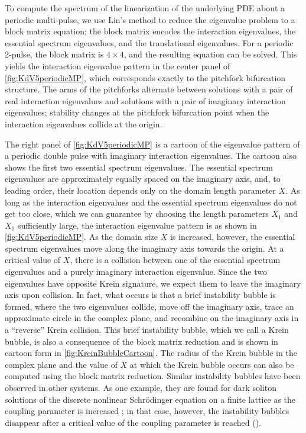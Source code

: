 \documentclass[12pt]{elsarticle}
\theoremstyle{plain}
\theoremstyle{definition}
\theoremstyle{remark}
\numberwithin{theorem}{section}
\numberwithin{equation}{section}
\begin{document}
To compute the spectrum of the linearization of the underlying PDE about a periodic multi-pulse, we use Lin's method to reduce the eigenvalue problem to a block matrix equation; the block matrix encodes the interaction eigenvalues, the essential spectrum eigenvalues, and the translational eigenvalues. For a periodic 2-pulse, the block matrix is $4\times4$, and the resulting equation can be solved. This yields the interaction eigenvalue pattern in the center panel of \cref{fig:KdV5periodicMP}, which corresponds exactly to the pitchfork bifurcation structure. The arms of the pitchforks alternate between solutions with a pair of real interaction eigenvalues and solutions with a pair of imaginary interaction eigenvalues; stability changes at the pitchfork bifurcation point when the interaction eigenvalues collide at the origin. 

The right panel of \cref{fig:KdV5periodicMP} is a cartoon of the eigenvalue pattern of a periodic double pulse with imaginary interaction eigenvalues. The cartoon also shows the first two essential spectrum eigenvalues. The essential spectrum eigenvalues are approximately equally spaced on the imaginary axis, and, to leading order, their location depends only on the domain length parameter $X$. As long as the interaction eigenvalues and the essential spectrum eigenvalues do not get too close, which we can guarantee by choosing the length parameters $X_1$ and $X_1$ sufficiently large, the interaction eigenvalue pattern is as shown in \cref{fig:KdV5periodicMP}. As the domain size $X$ is increased, however, the essential spectrum eigenvalues move along the imaginary axis towards the origin. At a critical value of $X$, there is a collision between one of the essential spectrum eigenvalues and a purely imaginary interaction eigenvalue. Since the two eigenvalues have opposite Krein signature, we expect them to leave the imaginary axis upon collision. In fact, what occurs is that a brief instability bubble is formed, where the two eigenvalues collide, move off the imaginary axis, trace an approximate circle in the complex plane, and recombine on the imaginary axis in a ``reverse'' Krein collision. This brief instability bubble, which we call a Krein bubble, is also a consequence of the block matrix reduction and is shown in cartoon form in \cref{fig:KreinBubbleCartoon}. The radius of the Krein bubble in the complex plane and the value of $X$ at which the Krein bubble occurs can also be computed using the block matrix reduction. Similar instability bubbles have been observed in other systems. As one example, they are found for dark soliton solutions of the discrete nonlinear Schr{\"o}dinger equation on a finite lattice as the coupling parameter is increased \cite{Johansson1999}; in that case, however, the instability bubbles disappear after a critical value of the coupling parameter is reached (\cite[Figure 2]{Johansson1999}).
\end{document}
